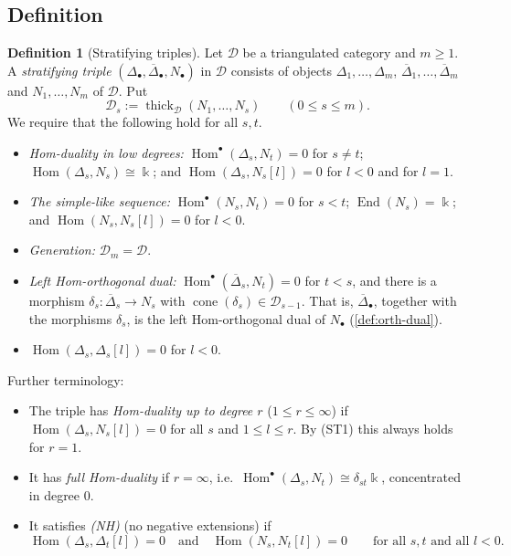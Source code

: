 \documentclass[11pt,reqno]{amsart}
\theoremstyle{plain}
\theoremstyle{definition}
\newtheorem{definition}[theorem]{Definition}
\theoremstyle{remark}
\newcommand{\kk}{\Bbbk}
\DeclareMathOperator{\Hom}{Hom}
\DeclareMathOperator{\End}{End}
\DeclareMathOperator{\cone}{cone}
\newcommand{\thick}[2][\cD]{\operatorname{thick}_{#1}(#2)}
\newcommand{\Deltabar}{\overline{\Delta}}
\newcommand{\cD}{\mathcal{D}}
\begin{document}
\subsection{Definition}

\begin{definition}[Stratifying triples]\label{def:triple}
Let $\cD$ be a triangulated category and $m\ge1$. A \emph{stratifying triple} $(\Delta_\bullet,\Deltabar_\bullet,N_\bullet)$ in $\cD$ consists of objects $\Delta_1,\dots,\Delta_m$, $\Deltabar_1,\dots,\Deltabar_m$ and $N_1,\dots,N_m$ of $\cD$. Put
\[\cD_s:=\thick{N_1,\dots,N_s}\qquad(0\le s\le m).\]
We require that the following hold for all $s,t$.
\begin{itemize}
\item[\textup{(ST1)}] \emph{Hom-duality in low degrees:} $\Hom^\bullet(\Delta_s,N_t)=0$ for $s\ne t$; $\Hom(\Delta_s,N_s)\cong\kk$; and $\Hom(\Delta_s,N_s[l])=0$ for $l<0$ and for $l=1$.
\item[\textup{(ST2)}] \emph{The simple-like sequence:} $\Hom^\bullet(N_s,N_t)=0$ for $s<t$; $\End(N_s)=\kk$; and $\Hom(N_s,N_s[l])=0$ for $l<0$.
\item[\textup{(ST3)}] \emph{Generation:} $\cD_m=\cD$.
\item[\textup{(ST4)}] \emph{Left Hom-orthogonal dual:} $\Hom^\bullet(\Deltabar_s,N_t)=0$ for $t<s$, and there is a morphism $\delta_s\colon\Deltabar_s\to N_s$ with $\cone(\delta_s)\in\cD_{s-1}$. That is, $\Deltabar_\bullet$, together with the morphisms $\delta_s$, is the left Hom-orthogonal dual of $N_\bullet$ (\cref{def:orth-dual}).
\item[\textup{(ST5)}] $\Hom(\Delta_s,\Delta_s[l])=0$ for $l<0$.
\end{itemize}
Further terminology:
\begin{itemize}
\item The triple has \emph{Hom-duality up to degree $r$} ($1\le r\le\infty$) if $\Hom(\Delta_s,N_s[l])=0$ for all $s$ and $1\le l\le r$. By (ST1) this always holds for $r=1$.
\item It has \emph{full Hom-duality} if $r=\infty$, i.e.\ $\Hom^\bullet(\Delta_s,N_t)\cong\delta_{st}\kk$, concentrated in degree $0$.
\item It satisfies \emph{(NH)} (no negative extensions) if
\[\Hom(\Delta_s,\Delta_t[l])=0\quad\text{and}\quad\Hom(N_s,N_t[l])=0\qquad\text{for all $s,t$ and all $l<0$.}\]
\end{itemize}
\end{definition}
\end{document}

